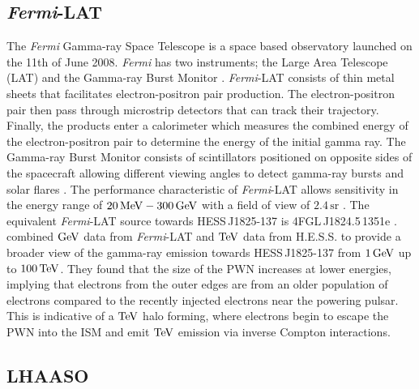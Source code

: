\subsection{\textit{Fermi}-LAT}

The \textit{Fermi} Gamma-ray Space Telescope is a space based observatory launched on the 11th of June 2008. \textit{Fermi} has two instruments; the Large Area Telescope (LAT) and the Gamma-ray Burst Monitor \citep{2010RPPh...73g4901M}. \textit{Fermi}-LAT consists of thin metal sheets that facilitates electron-positron pair production. The electron-positron pair then pass through microstrip detectors that can track their trajectory. Finally, the products enter a calorimeter which measures the combined energy of the electron-positron pair to determine the energy of the initial gamma ray. The Gamma-ray Burst Monitor consists of scintillators positioned on opposite sides of the spacecraft allowing different viewing angles to detect gamma-ray bursts and solar flares \citep{2010RPPh...73g4901M}. The performance characteristic of \textit{Fermi}-LAT allows sensitivity in the energy range of $20\,\si{\mega\electronvolt} - 300\,\si{\giga\electronvolt}$ with a field of view of $2.4\,\si{\steradian}$ \citep{2010RPPh...73g4901M}. 
\newpar
The equivalent \textit{Fermi}-LAT source towards \mbox{HESS\,J1825-137} is \mbox{4FGL\,J1824.5\,1351e} \citep{2020ApJS..247...33A}. \cite{2020A&A...640A..76P} combined $\si{\giga\electronvolt}$ data from \textit{Fermi}-LAT and $\TeV$ data from H.E.S.S. to provide a broader view of the gamma-ray emission towards \mbox{HESS\,J1825-137} from $1\,\si{\giga\electronvolt}$ up to $100\,\TeV$. They found that the size of the PWN increases at lower energies, implying that electrons from the outer edges are from an older population of electrons compared to the recently injected electrons near the powering pulsar. This is indicative of a $\TeV$ halo forming, where electrons begin to escape the PWN into the ISM and emit $\TeV$ emission via inverse Compton interactions.

\subsection{LHAASO}

